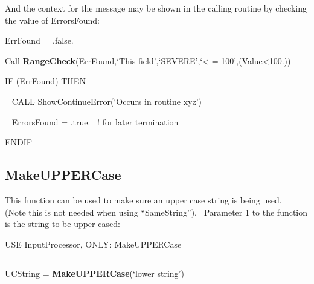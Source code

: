 And the context for the message may be shown in the calling routine by checking the value of ErrorsFound:

ErrFound = .false.

Call \textbf{RangeCheck}(ErrFound,`This field',`SEVERE',`\textless{} = 100',(Value\textless{}100.))

IF (ErrFound) THEN

~ CALL ShowContinueError(`Occurs in routine xyz')

~ ErrorsFound = .true.~ ! for later termination

ENDIF

\subsection{MakeUPPERCase}\label{makeuppercase}

This function can be used to make sure an upper case string is being used.~ (Note this is not needed when using ``SameString'').~ Parameter 1 to the function is the string to be upper cased:

USE InputProcessor, ONLY: MakeUPPERCase

\begin{center}\rule{0.5\linewidth}{\linethickness}\end{center}

UCString = \textbf{MakeUPPERCase}(`lower string')

